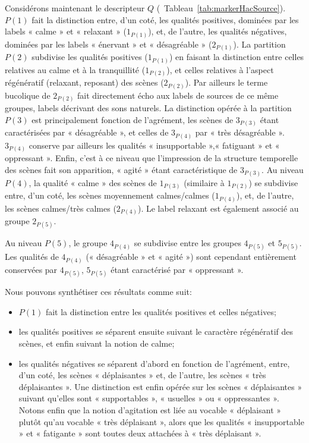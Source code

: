 Considérons maintenant le descripteur $Q$ (\cf~Tableau~\ref{tab:markerHacSource}). $P(1)$ fait la distinction entre, d'un coté, les qualités positives, dominées par les labels « calme » et « relaxant » ($1_{P(1)}$), et, de l'autre, les qualités négatives, dominées par les labels « énervant » et « désagréable » ($2_{P(1)}$). La partition $P(2)$ subdivise les qualités positives ($1_{P(1)}$) en faisant la distinction entre celles relatives au calme et à la tranquillité ($1_{P(2)}$), et celles relatives à l'aspect régénératif (relaxant, reposant) des scènes ($2_{P(2)}$). Par ailleurs le terme bucolique de $2_{P(2)}$ fait directement écho aux labels de sources de ce même groupes, labels décrivant des sons naturels.  La distinction opérée à la partition $P(3)$ est principalement fonction de l'agrément, les scènes de $3_{P(3)}$ étant caractérisées par « désagréable », et celles de  $3_{P(4)}$ par « très désagréable ».  $3_{P(4)}$ conserve par ailleurs les qualités  « insupportable »,« fatiguant » et « oppressant ». Enfin, c'est à ce niveau que l'impression de la structure temporelle des scènes fait son apparition,  « agité » étant caractéristique de $3_{P(3)}$. Au niveau $P(4)$, la qualité « calme » des scènes de $1_{P(3)}$ (similaire à $1_{P(2)}$) se subdivise entre, d'un coté, les scènes moyennement calmes/calmes ($1_{P(4)}$), et, de l'autre, les scènes calmes/très calmes ($2_{P(4)}$). Le label relaxant est également associé au groupe $2_{P(5)}$.

Au niveau $P(5)$, le groupe $4_{P(4)}$ se subdivise entre les groupes $4_{P(5)}$ et $5_{P(5)}$. Les qualités de $4_{P(4)}$  (« désagréable » et « agité ») sont cependant entièrement conservées par $4_{P(5)}$,  $5_{P(5)}$ étant caractérisé par « oppressant ».

Nous pouvons synthétiser ces résultats comme suit:

\begin{itemize}
\item $P(1)$ fait la distinction entre les qualités positives et celles négatives;
\item les qualités positives se séparent ensuite suivant le caractère régénératif des scènes, et enfin suivant la notion de calme;
\item les qualités négatives se séparent d'abord en fonction de l'agrément, entre, d'un coté, les scènes « déplaisantes » et, de l'autre, les scènes « très déplaisantes ». Une distinction est enfin opérée sur les scènes « déplaisantes » suivant qu'elles sont « supportables », « usuelles » ou « oppressantes ». Notons enfin que la notion d'agitation est liée au vocable « déplaisant » plutôt qu'au vocable « très déplaisant », alors que les qualités « insupportable » et « fatigante » sont toutes deux attachées à « très déplaisant ».
\end{itemize}


